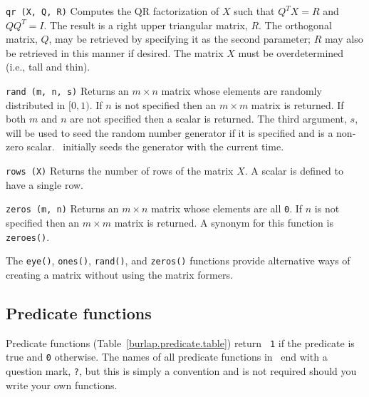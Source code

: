 \begin{dispitems}
\item[\tt qr (X, Q, R)]
Computes the QR factorization of $X$ such that $Q^TX = R$ and $QQ^T =
I$.  The result is a right upper triangular matrix, $R$.  The
orthogonal matrix, $Q$, may be retrieved by specifying it as the
second parameter; $R$ may also be retrieved in this manner if desired.
The matrix $X$ must be overdetermined (i.e., tall and thin).

\item[\tt rand (m, n, s)]
Returns an $m \times n$ matrix whose elements are randomly distributed
in $[0, 1)$.  If $n$ is not specified then an $m \times m$ matrix is
returned.  If both $m$ and $n$ are not specified then a scalar is
returned.  The third argument, $s$, will be used to seed the random
number generator if it is specified and is a non-zero scalar.
\burlap\ initially seeds the generator with the current time.

\item[\tt rows (X)]
Returns the number of rows of the matrix $X$.  A scalar is defined to
have a single row.

\item[\tt zeros (m, n)]
Returns an $m \times n$ matrix whose elements are all {\tt 0}.  If $n$
is not specified then an $m \times m$ matrix is returned.  A synonym
for this function is {\tt zeroes()}.
\end{dispitems}

The {\tt eye()}, {\tt ones()}, {\tt rand()}, and {\tt zeros()}
functions provide alternative ways of creating a matrix without using
the matrix formers.


\subsection{Predicate functions}
\label{burlap.predicate.functions}

Predicate functions (Table~\ref{burlap.predicate.table}) return {\tt
1} if the predicate is true and {\tt 0} otherwise.  The names of all
predicate functions in \burlap\ end with a question mark, {\tt ?}, but
this is simply a convention and is not required should you write your
own functions.

